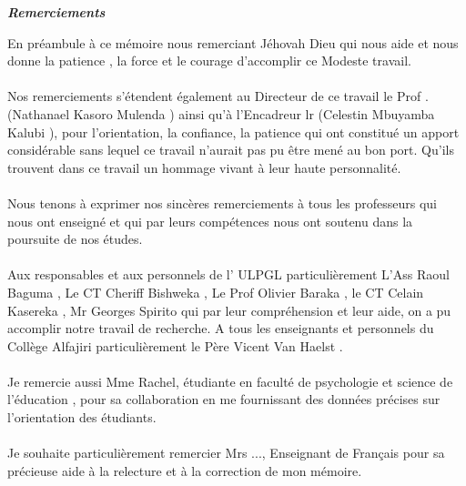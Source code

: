 \begin{center}
	{\Large \textit {\textbf{Remerciements }}}%
\end{center}
En préambule à ce mémoire nous remerciant Jéhovah Dieu  qui nous aide et nous donne la patience , la force et le courage d’accomplir ce Modeste travail.
\paragraph{}
Nos remerciements s’étendent également au Directeur de ce travail le Prof . (Nathanael Kasoro Mulenda ) ainsi qu'à l'Encadreur lr (Celestin Mbuyamba Kalubi ), pour l’orientation, la confiance, la patience qui ont constitué un apport considérable sans lequel ce travail n’aurait pas pu être mené au bon port. Qu’ils trouvent dans ce travail un hommage vivant à leur haute personnalité.\\
\paragraph{}
Nous tenons à exprimer nos sincères remerciements à tous les professeurs qui nous ont enseigné et qui par leurs compétences nous ont soutenu dans la poursuite de nos études.
\paragraph{}
Aux responsables et aux personnels de l' ULPGL  particulièrement  L'Ass Raoul Baguma , Le CT Cheriff Bishweka , Le Prof Olivier Baraka , le CT Celain Kasereka , Mr Georges Spirito  qui par leur compréhension et leur aide, on a pu accomplir notre travail de recherche.
A tous les enseignants et personnels du Collège Alfajiri particulièrement le Père Vicent Van Haelst  .
\paragraph{}
Je remercie aussi Mme Rachel, étudiante en faculté de psychologie et science de l'éducation  , pour sa collaboration en me fournissant des données précises sur l'orientation des étudiants.
\paragraph{}
Je souhaite particulièrement remercier Mrs ..., Enseignant de Français  pour sa précieuse aide à la relecture et à la correction de mon mémoire. 

